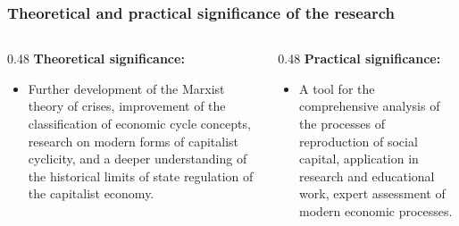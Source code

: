 \begin{frame}
  \frametitle{Theoretical and practical significance of the research}
  \begin{columns}[T,onlytextwidth]
    \begin{column}{0.48\textwidth}
      \textbf{Theoretical significance:}
      \begin{itemize}
        \item Further development of the Marxist theory of crises, improvement of the classification of economic cycle concepts, research on modern forms of capitalist cyclicity, and a deeper understanding of the historical limits of state regulation of the capitalist economy.
      \end{itemize}
    \end{column}

    \begin{column}{0.48\textwidth}
      \textbf{Practical significance:}
      \begin{itemize}
        \item A tool for the comprehensive analysis of the processes of reproduction of social capital, application in research and educational work, expert assessment of modern economic processes.
      \end{itemize}
    \end{column}
  \end{columns}
\end{frame}

